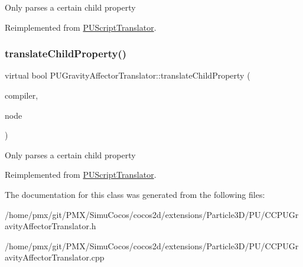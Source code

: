 Only parses a certain child property 

Reimplemented from \hyperlink{classPUScriptTranslator_a0374d83a8a04e57918975d525e0f8fe8}{P\+U\+Script\+Translator}.

\mbox{\label{classPUGravityAffectorTranslator_a910c939dc79a241c2a2699fea634bb80}} 
\subsubsection{\texorpdfstring{translate\+Child\+Property()}{translateChildProperty()}\hspace{0.1cm}{\footnotesize\ttfamily [2/2]}}
{\footnotesize\ttfamily virtual bool P\+U\+Gravity\+Affector\+Translator\+::translate\+Child\+Property (\begin{DoxyParamCaption}\item[{\hyperlink{classPUScriptCompiler}{P\+U\+Script\+Compiler} $\ast$}]{compiler,  }\item[{\hyperlink{classPUAbstractNode}{P\+U\+Abstract\+Node} $\ast$}]{node }\end{DoxyParamCaption})\hspace{0.3cm}{\ttfamily [virtual]}}

Only parses a certain child property 

Reimplemented from \hyperlink{classPUScriptTranslator_a0374d83a8a04e57918975d525e0f8fe8}{P\+U\+Script\+Translator}.



The documentation for this class was generated from the following files\+:\begin{DoxyCompactItemize}
\item 
/home/pmx/git/\+P\+M\+X/\+Simu\+Cocos/cocos2d/extensions/\+Particle3\+D/\+P\+U/C\+C\+P\+U\+Gravity\+Affector\+Translator.\+h\item 
/home/pmx/git/\+P\+M\+X/\+Simu\+Cocos/cocos2d/extensions/\+Particle3\+D/\+P\+U/C\+C\+P\+U\+Gravity\+Affector\+Translator.\+cpp\end{DoxyCompactItemize}
